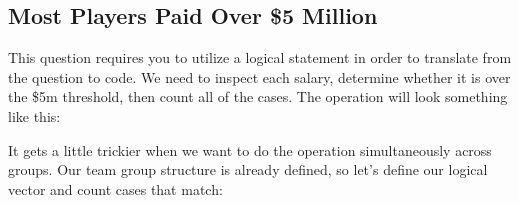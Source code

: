 \documentclass[]{book}
\newenvironment{Shaded}{\begin{snugshade}}{\end{snugshade}}
\newcommand{\CommentTok}[1]{\textcolor[rgb]{0.56,0.35,0.01}{\textit{#1}}}
\newcommand{\DecValTok}[1]{\textcolor[rgb]{0.00,0.00,0.81}{#1}}
\newcommand{\FloatTok}[1]{\textcolor[rgb]{0.00,0.00,0.81}{#1}}
\newcommand{\KeywordTok}[1]{\textcolor[rgb]{0.13,0.29,0.53}{\textbf{#1}}}
\newcommand{\NormalTok}[1]{#1}
\newcommand{\OperatorTok}[1]{\textcolor[rgb]{0.81,0.36,0.00}{\textbf{#1}}}
\newcommand{\StringTok}[1]{\textcolor[rgb]{0.31,0.60,0.02}{#1}}
\theoremstyle{definition}
\theoremstyle{definition}
\theoremstyle{definition}
\theoremstyle{remark}
\begin{document}
\hypertarget{most-players-paid-over-5-million}{%
\subsection{Most Players Paid Over \$5
Million}\label{most-players-paid-over-5-million}}

This question requires you to utilize a logical statement in order to
translate from the question to code. We need to inspect each salary,
determine whether it is over the \$5m threshold, then count all of the
cases. The operation will look something like this:

\begin{Shaded}
\end{Shaded}

It gets a little trickier when we want to do the operation
simultaneously across groups. Our team group structure is already
defined, so let's define our logical vector and count cases that match:

\begin{Shaded}
\end{Shaded}
\end{document}
